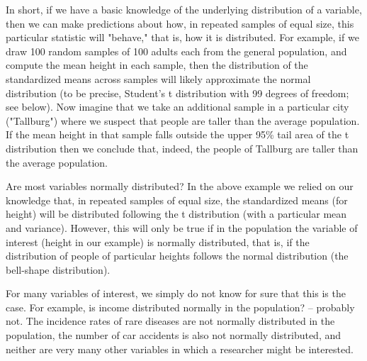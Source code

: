 In short, if we have a basic knowledge of the underlying distribution of a variable, then we can make 
predictions about how, in repeated samples of equal size, this particular statistic will "behave," that is, 
how it is distributed. For example, if we draw 100 random samples of 100 adults each from the general 
population, and compute the mean height in each sample, then the distribution of the standardized 
means across samples will likely approximate the normal distribution (to be precise, Student's t distribution 
with 99 degrees of freedom; see below). Now imagine that we take an additional sample in a particular 
city ("Tallburg") where we suspect that people are taller than the average population. 
If the mean height in that sample falls outside the upper 95\% tail area of the t distribution then we conclude that, indeed, the people of Tallburg are taller than the average population.

Are most variables normally distributed? In the above example we relied on our knowledge that, in repeated samples of 
equal size, the standardized means (for height) will be distributed following the t distribution (with a particular 
mean and variance). However, this will only be true if in the population the variable of interest (height in our example) 
is normally distributed, that is, if the distribution of people of particular heights follows the normal distribution 
(the bell-shape distribution).

For many variables of interest, we simply do not know for sure that this is the case. 
For example, is income distributed normally in the population? -- probably not. The incidence rates of rare diseases 
are not normally distributed in the population, the number of car accidents is also not normally distributed, and 
neither are very many other variables in which a researcher might be interested.


